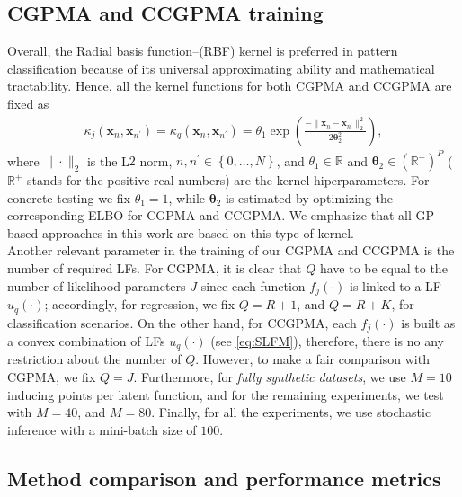 \documentclass[journal]{IEEEtran}
\newcommand{\Real}{\mathbb{R}}
\newcommand{\boldx}{\mathbf{x}}
\begin{document}
\subsection{CGPMA and CCGPMA training}\label{sec:training}
Overall, the Radial basis function--(RBF) kernel is preferred in pattern classification because of its universal approximating ability and mathematical tractability. Hence, all the kernel functions for both CGPMA and CCGPMA are fixed as
\begin{align}\label{eq:RBF}
\kappa_j(\boldx_n, \boldx_{n^{\prime}})=\kappa_q(\boldx_n, \boldx_{n^{\prime}}) = \theta_1\exp\left(\frac{-\|\boldx_n- \boldx_{n^{\prime}} \|_2^2}{2\bm{\theta}_2^2}\right),
\end{align}
where $\|\cdot\|_2$ is the L$2$ norm, $n,n^{\prime} \in \left\{0,\dots , N\right\}$, and $\theta_1\in \Real$ and $\bm{\theta}_2\in (\Real^{+})^{P}$ ($\Real^{+}$ stands for the positive real numbers) are the kernel hiperparameters. For concrete testing we fix $\theta_1 = 1$, while $\bm{\theta}_2$ is estimated by optimizing the corresponding ELBO for CGPMA and CCGPMA. We emphasize that all GP-based approaches in this work are based on this type of kernel.\\
Another relevant parameter in the training of our CGPMA and CCGPMA is the number of required LFs. For CGPMA, it is clear that $Q$ have to be equal to the number of likelihood parameters $J$ since each function $f_j(\cdot)$ is linked to a LF $u_q(\cdot)$; accordingly, for regression, we fix $Q=R+1$, and $Q=R+K$, for classification scenarios. On the other hand, for CCGPMA, each $f_j(\cdot)$ is built as a convex combination of LFs $u_q(\cdot)$ (see \cref{eq:SLFM}), therefore, there is no any restriction about the number of $Q$. However, to make a fair comparison with CGPMA, we fix $Q=J$. Furthermore, for \textit{fully synthetic datasets}, we use $M=10$ inducing points per latent function, and for the remaining experiments, we test with $M=40$, and $M=80$. Finally, for all the experiments, we use stochastic inference with a mini-batch size of $100$.

\subsection{Method comparison and performance metrics}
\end{document}
